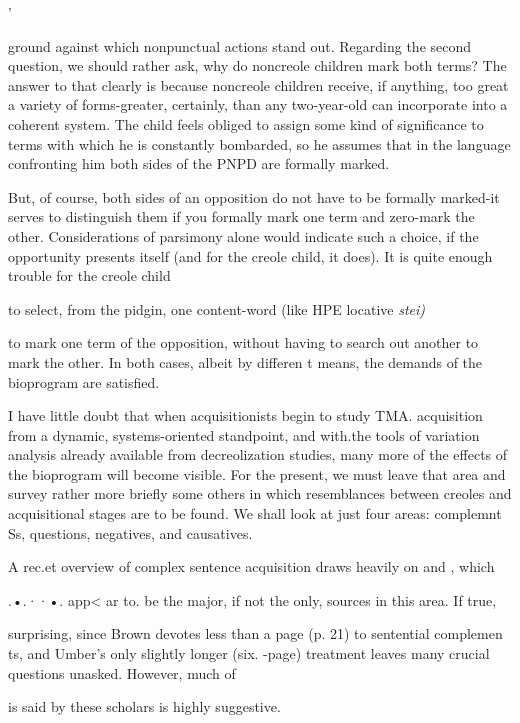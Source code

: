 '


ground against which nonpunctual actions stand out. Regarding the second question, we should rather ask, why do noncreole children mark both terms? The answer to that clearly is because noncreole children receive, if anything, too great a variety of forms-greater, certainly, than any two-year-old can incorporate into a coherent system. The child feels obliged to assign some kind of significance to terms with which he is constantly bombarded, so he assumes that in the language confronting him both sides of the PNPD are formally marked.

But, of course, both sides of an opposition do not have to be formally marked-it serves to distinguish them if you formally mark one term and zero-mark the other. Considerations of parsimony alone would indicate such a choice, if the opportunity presents itself (and for the creole child, it does). It is quite enough trouble for the creole child

to select, from the pidgin, one content-word (like HPE locative \textit{stei)}

to mark one term of the opposition, without having to search out another to mark the other. In both cases, albeit by differen t means, the demands of the bioprogram are satisfied.

I have little doubt that when acquisitionists begin to study TMA. acquisition from a dynamic, systems-oriented standpoint, and with.the tools of variation analysis already available from decreolization studies, many more of the effects of the bioprogram will become visible. For the present, we must leave that area and survey rather more briefly some others in which resemblances between creoles and acqui\-sitional stages are to be found. We shall look at just four areas: comple\-mnt Ss, questions, negatives, and causatives.

A rec.et overview of complex sentence acquisition \citep{Bowerman1979} draws heavily on \citet{Brown1973} and \citet{Limber1973}, which

.•.··•. app{\textless} ar to. be the major, if not the only, sources in this area. If true,

surprising, since Brown devotes less than a page (p. 21) to sen\-tential complemen ts, and Umber's only slightly longer (six. {}-page) treatment leaves many crucial questions unasked. However, much of

is said by these scholars is highly suggestive.

